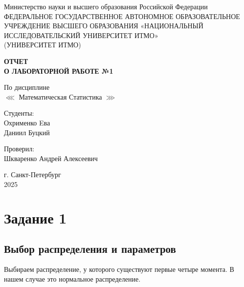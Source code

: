 \documentclass[14pt]{extreport}
\begin{document}
\begin{titlepage}
    \centering
    \vspace*{1cm}

    {\large Министерство науки и высшего образования Российской Федерации}\\
    {\large ФЕДЕРАЛЬНОЕ ГОСУДАРСТВЕННОЕ АВТОНОМНОЕ ОБРАЗОВАТЕЛЬНОЕ УЧРЕЖДЕНИЕ ВЫСШЕГО ОБРАЗОВАНИЯ «НАЦИОНАЛЬНЫЙ ИССЛЕДОВАТЕЛЬСКИЙ УНИВЕРСИТЕТ ИТМО»}\\
    {\large (УНИВЕРСИТЕТ ИТМО)}\\

    \vspace{1cm}

    \textbf{{\Huge ОТЧЕТ}\\
    {\Huge О ЛАБОРАТОРНОЙ РАБОТЕ №1}}\\

    \vspace{1cm}

    {\LARGE По дисциплине\\
     \(\lll\) Математическая Статистика \(\ggg\) }\\

    \vspace{2cm}

    {\Large Студенты:}\\
    Охрименко Eва\\
    Даниил Буцкий


    \vspace{2cm}

    {\Large Проверил:}\\
    Шкваренко Андрей Алексеевич\\

    \vspace{2cm}

    {\large г. Санкт-Петербург}\\
    {\large 2025}

\end{titlepage}
\newpage
\tableofcontents
\newpage

\chapter{Задание 1}

\section{Выбор распределения и параметров}

Выбираем распределение, у которого существуют первые четыре момента. В нашем случае это нормальное распределение.
\end{document}

